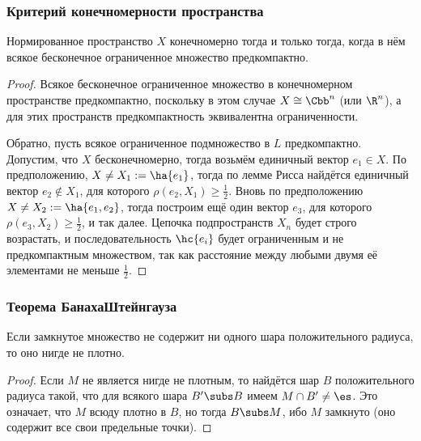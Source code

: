 \documentclass[a4paper]{article}
\begin{document}
\subsubsection{Критерий конечномерности пространства}

\begin{lemma}\label{lem:bounded.eq.compact.dim.finite}
Нормированное пространство $X$ конечномерно тогда и только тогда,
когда в нём всякое бесконечное ограниченное множество предкомпактно.
\end{lemma}
\begin{proof}
Всякое бесконечное ограниченное множество в конечномерном пространстве
предкомпактно, поскольку в этом случае $X \cong \Cbb^n$ (или $\R^n$),
а для этих пространств предкомпактность эквивалентна ограниченности.

Обратно, пусть всякое ограниченное подмножество в $L$ предкомпактно.
Допустим, что $X$ бесконечномерно, тогда возьмём единичный вектор $e_1 \in X$.
По предположению, $X \neq X_1 := \ha{e_1}$, тогда по лемме Рисса найдётся единичный
вектор $e_2 \notin X_1$, для которого $\rho(e_2, X_1) \ge \frac12$.
Вновь по предположению $X \neq X_2 := \ha{e_1,e_2}$, тогда построим
ещё один вектор $e_3$, для которого $\rho(e_3, X_2) \ge \frac12$, и так далее.
Цепочка подпространств $X_n$ будет строго возрастать, и последовательность $\hc{e_i}$
будет ограниченным и не предкомпактным множеством, так как расстояние между любыми двумя
её элементами не меньше $\frac12$.
\end{proof}


\subsubsection{Теорема Банаха\ч Штейнгауза}

\begin{lemma}
Если замкнутое множество не содержит ни одного шара положительного радиуса, то оно нигде не плотно.
\end{lemma}
\begin{proof}
Если $M$ не является нигде не плотным, то найдётся шар $B$ положительного радиуса
такой, что для всякого шара $B' \subs B$ имеем $M \cap B' \neq \es$. Это означает,
что $M$ всюду плотно в $B$, но тогда $B \subs M$,
ибо $M$ замкнуто (оно содержит все свои предельные точки).
\end{proof}
\end{document}
